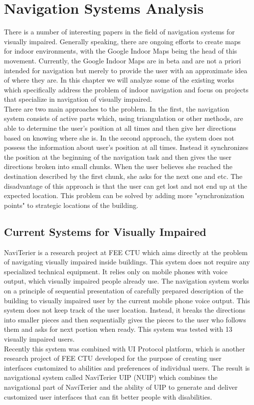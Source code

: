 \chapter{Navigation Systems Analysis}
There is a number of interesting papers in the field of navigation systems for visually impaired. Generally speaking, there are ongoing efforts to create maps for indoor environments, with the Google Indoor Maps being the head of this movement. Currently, the Google Indoor Maps are in beta and are not a priori intended for navigation but merely to provide the user with an approximate idea of where they are. In this chapter we will analyze some of the existing works which specifically address the problem of indoor navigation and focus on projects that specialize in navigation of visually impaired.\\
There are two main approaches to the problem. In the first, the navigation system consists of active parts which, using triangulation or other methods, are able to determine the user's position at all times and then give her directions based on knowing where she is. In the second approach, the system does not possess the information about user's position at all times. Instead it synchronizes the position at the beginning of the navigation task and then gives the user directions broken into small chunks. When the user believes she reached the destination described by the first chunk, she asks for the next one and etc. The disadvantage of this approach is that the user can get lost and not end up at the expected location. This problem can be solved by adding more "synchronization points" to strategic locations of the building.

\section{Current Systems for Visually Impaired}
NaviTerier \cite{naviterier} is a research project at FEE CTU which aims directly at the problem of navigating visually impaired inside buildings. This system does not require any specialized technical equipment. It relies only on mobile phones with voice output, which visually impaired people already use. The navigation system works on a principle of sequential presentation of carefully prepared description of the building to visually impaired user by the current mobile phone voice output. This system does not keep track of the user location. Instead, it breaks the directions into smaller pieces and then sequentially gives the  pieces to the user who follows them and asks for next portion when ready. This system was tested with 13 visually impaired users.\\
Recently this system was combined with UI Protocol platform, which is another research project of FEE CTU developed for the purpose of creating user interfaces customized to abilities and preferences of individual users. The result is navigational system called NaviTerier UIP (NUIP) \cite{balata} which combines the navigational part of NaviTerier and the ability of UIP to generate and deliver customized user interfaces that can fit better people with disabilities.\\

